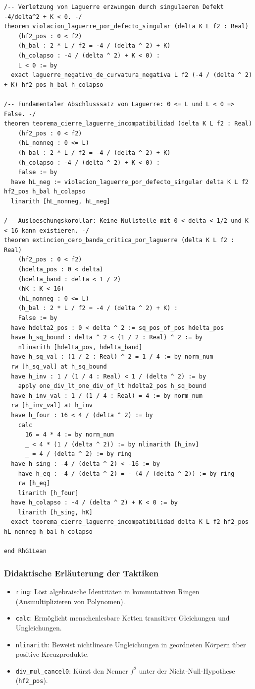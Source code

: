 \documentclass[11pt,a4paper]{article}
\theoremstyle{definition}
\theoremstyle{remark}
\begin{document}
\begin{lstlisting}[language=Lean4]
/-- Verletzung von Laguerre erzwungen durch singulaeren Defekt -4/delta^2 + K < 0. -/
theorem violacion_laguerre_por_defecto_singular (delta K L f2 : Real)
    (hf2_pos : 0 < f2)
    (h_bal : 2 * L / f2 = -4 / (delta ^ 2) + K)
    (h_colapso : -4 / (delta ^ 2) + K < 0) :
    L < 0 := by
  exact laguerre_negativo_de_curvatura_negativa L f2 (-4 / (delta ^ 2) + K) hf2_pos h_bal h_colapso

/-- Fundamentaler Abschlusssatz von Laguerre: 0 <= L und L < 0 => False. -/
theorem teorema_cierre_laguerre_incompatibilidad (delta K L f2 : Real)
    (hf2_pos : 0 < f2)
    (hL_nonneg : 0 <= L)
    (h_bal : 2 * L / f2 = -4 / (delta ^ 2) + K)
    (h_colapso : -4 / (delta ^ 2) + K < 0) :
    False := by
  have hL_neg := violacion_laguerre_por_defecto_singular delta K L f2 hf2_pos h_bal h_colapso
  linarith [hL_nonneg, hL_neg]

/-- Ausloeschungskorollar: Keine Nullstelle mit 0 < delta < 1/2 und K < 16 kann existieren. -/
theorem extincion_cero_banda_critica_por_laguerre (delta K L f2 : Real)
    (hf2_pos : 0 < f2)
    (hdelta_pos : 0 < delta)
    (hdelta_band : delta < 1 / 2)
    (hK : K < 16)
    (hL_nonneg : 0 <= L)
    (h_bal : 2 * L / f2 = -4 / (delta ^ 2) + K) :
    False := by
  have hdelta2_pos : 0 < delta ^ 2 := sq_pos_of_pos hdelta_pos
  have h_sq_bound : delta ^ 2 < (1 / 2 : Real) ^ 2 := by
    nlinarith [hdelta_pos, hdelta_band]
  have h_sq_val : (1 / 2 : Real) ^ 2 = 1 / 4 := by norm_num
  rw [h_sq_val] at h_sq_bound
  have h_inv : 1 / (1 / 4 : Real) < 1 / (delta ^ 2) := by
    apply one_div_lt_one_div_of_lt hdelta2_pos h_sq_bound
  have h_inv_val : 1 / (1 / 4 : Real) = 4 := by norm_num
  rw [h_inv_val] at h_inv
  have h_four : 16 < 4 / (delta ^ 2) := by
    calc
      16 = 4 * 4 := by norm_num
      _ < 4 * (1 / (delta ^ 2)) := by nlinarith [h_inv]
      _ = 4 / (delta ^ 2) := by ring
  have h_sing : -4 / (delta ^ 2) < -16 := by
    have h_eq : -4 / (delta ^ 2) = - (4 / (delta ^ 2)) := by ring
    rw [h_eq]
    linarith [h_four]
  have h_colapso : -4 / (delta ^ 2) + K < 0 := by
    linarith [h_sing, hK]
  exact teorema_cierre_laguerre_incompatibilidad delta K L f2 hf2_pos hL_nonneg h_bal h_colapso

end RhG1Lean
\end{lstlisting}

\subsubsection*{Didaktische Erläuterung der Taktiken}
\begin{itemize}
    \item \texttt{ring}: Löst algebraische Identitäten in kommutativen Ringen (Ausmultiplizieren von Polynomen).
    \item \texttt{calc}: Ermöglicht menschenlesbare Ketten transitiver Gleichungen und Ungleichungen.
    \item \texttt{nlinarith}: Beweist nichtlineare Ungleichungen in geordneten Körpern über positive Kreuzprodukte.
    \item \texttt{div\_mul\_cancel0}: Kürzt den Nenner $f^2$ unter der Nicht-Null-Hypothese (\texttt{hf2\_pos}).
\end{itemize}
\end{document}
